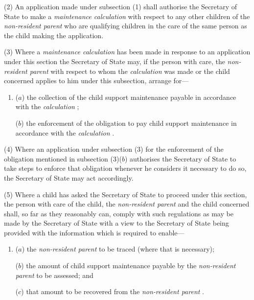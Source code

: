 \documentclass[12pt,a4paper]{article}
\begin{document}
(2) An application made under subsection (1)  shall authorise the Secretary of State to make a 
\emph{maintenance calculation}  %
with respect to any other children of the 
\emph{non-resident parent}  %
who are qualifying children in the care of the same person as the child making the application.

(3) Where a 
\emph{maintenance calculation}  %
has been made in response to an application under this section the Secretary of State may, if the person with care, the 
\emph{non-resident parent}  %
with respect to whom the 
\emph{calculation}  %
was made or the child concerned applies to him under this subsection, arrange for—
\begin{enumerate}\item[]
($a$) the collection of the child support maintenance payable in accordance with the 
\emph{calculation}%
;

($b$) the enforcement of the obligation to pay child support maintenance in accordance with the 
\emph{calculation}%
.
\end{enumerate}

(4) Where an application under subsection (3)  for the enforcement of the obligation mentioned in subsection (3)($b$)  authorises the Secretary of State to take steps to enforce that obligation whenever he considers it necessary to do so, the Secretary of State may act accordingly.

(5) Where a child has asked the Secretary of State to proceed under this section, the person with care of the child, the 
\emph{non-resident parent}  %
and the child concerned shall, so far as they reasonably can, comply with such regulations as may be made by the Secretary of State with a view to the Secretary of State 
being provided with the information which is required to enable—
\begin{enumerate}\item[]
($a$) the 
\emph{non-resident parent}  %
to be traced (where that is necessary);

($b$) the amount of child support maintenance payable by the 
\emph{non-resident parent}  %
to be assessed; and

($c$) that amount to be recovered from the 
\emph{non-resident parent}%
.
\end{enumerate}
\end{document}
